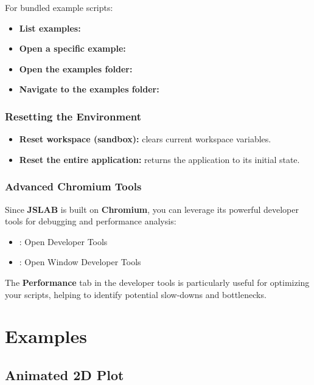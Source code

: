 \documentclass[12pt,a4paper]{article}
\begin{document}
For bundled example scripts:
\begin{itemize}
  \item \textbf{List examples:} 
  \item \textbf{Open a specific example:} 
  \item \textbf{Open the examples folder:} 
  \item \textbf{Navigate to the examples folder:} 
\end{itemize}

\subsubsection{Resetting the Environment}
\begin{itemize}
  \item \textbf{Reset workspace (sandbox):}  clears current workspace variables.
  \item \textbf{Reset the entire application:}  returns the application to its initial state.
\end{itemize}

\subsubsection{Advanced Chromium Tools}
Since \textbf{JSLAB} is built on \textbf{Chromium}, you can leverage its powerful developer tools for debugging and performance analysis:
\begin{itemize}
  \item {}: Open Developer Tools
  \item {}: Open Window Developer Tools
\end{itemize}

The \textbf{Performance} tab in the developer tools is particularly useful for optimizing your scripts, helping to identify potential slow-downs and bottlenecks.

\section{Examples}

\subsection{Animated 2D Plot}
\label{sec:animated-2d-plot}
\end{document}
